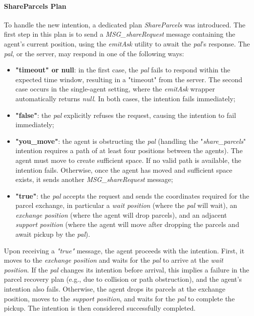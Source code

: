                 \paragraph{ShareParcels Plan}
                    To handle the new intention, a dedicated plan \textit{ShareParcels} was introduced. The first step in this plan is to send a \textit{MSG\_shareRequest} message containing the agent's current position, using the \textit{emitAsk} utility to await the \textit{pal}'s response. The \textit{pal}, or the server, may respond in one of the following ways:
                    \begin{itemize}
                        \item \textbf{"timeout" or null}: in the first case, the \textit{pal} fails to respond within the expected time window, resulting in a "timeout" from the server. The second case occurs in the single-agent setting, where the \textit{emitAsk} wrapper automatically returns \textit{null}. In both cases, the intention fails immediately;
                        \item \textbf{"false"}: the \textit{pal} explicitly refuses the request, causing the intention to fail immediately;
                        \item \textbf{"you\_move"}: the agent is obstructing the \textit{pal} (handling the "\textit{share\_parcels}" intention requires a path of at least four positions between the agents). The agent must move to create sufficient space. If no valid path is available, the intention fails. Otherwise, once the agent has moved and sufficient space exists, it sends another \textit{MSG\_shareRequest} message;
                        \item \textbf{"true"}: the \textit{pal} accepts the request and sends the coordinates required for the parcel exchange, in particular a \textit{wait position} (where the \textit{pal} will wait), an \textit{exchange position} (where the agent will drop parcels), and an adjacent \textit{support position} (where the agent will move after dropping the parcels and await pickup by the \textit{pal}).
                    \end{itemize}                   
                    Upon receiving a \textit{"true"} message, the agent proceeds with the intention. First, it moves to the \textit{exchange position} and waits for the \textit{pal} to arrive at the \textit{wait position}. If the \textit{pal} changes its intention before arrival, this implies a failure in the parcel recovery plan (e.g., due to collision or path obstruction), and the agent's intention also fails. Otherwise, the agent drops its parcels at the exchange position, moves to the \textit{support position}, and waits for the \textit{pal} to complete the pickup. The intention is then considered successfully completed.

